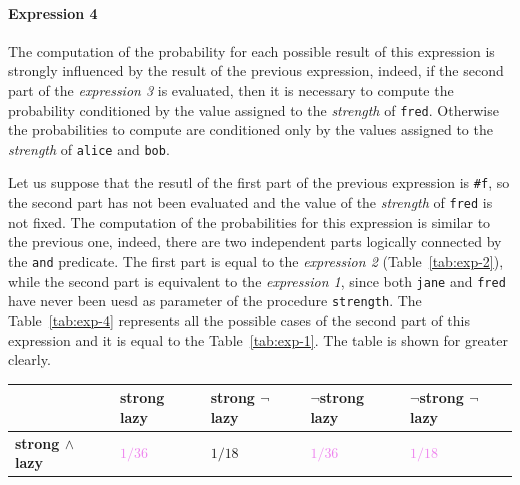 \begin{itemize}
        \paragraph*{Expression 4} The computation of the probability for each possible result of this expression is strongly 
        influenced by the result of the previous expression, indeed, if the second part of the \textit{expression 3} is evaluated,
        then it is necessary to compute the probability conditioned by the value assigned to the \textit{strength} of \texttt{\textquotesingle fred}.
        Otherwise the probabilities to compute are conditioned only by the values assigned to the \textit{strength} of \texttt{\textquotesingle alice}
        and \texttt{\textquotesingle bob}.

        Let us suppose that the resutl of the first part of the previous expression is \texttt{\#f}, so the second part has not been
        evaluated and the value of the \textit{strength} of \texttt{\textquotesingle fred} is not fixed.
        The computation of the probabilities for this expression is similar to the previous one, indeed, there are two independent
        parts logically connected by the \texttt{and} predicate. The first part is equal to the \textit{expression 2} 
        (Table~\ref{tab:exp-2}), while the second part is equivalent to the \textit{expression 1}, since both \texttt{\textquotesingle jane} and
        \texttt{\textquotesingle fred} have never been uesd as parameter of the procedure \texttt{strength}.
        The Table~\ref{tab:exp-4} represents all the possible cases of the second part of this expression and it is equal to
        the Table~\ref{tab:exp-1}. The table is shown for greater clearly. 
        \begin{table}[H]
            \centering
            \bgroup
                \def\arraystretch{1.5}
                \begin{tabular}{| l | C{1.8cm} C{1.8cm} C{1.8cm} C{1.8cm}  |}                    
                    \hline
                     & 
                        \textbf{strong lazy} & \textbf{strong $\neg$lazy} & \textbf{$\neg$strong lazy} & \textbf{$\neg$strong $\neg$lazy} \\
                    \hline

                    \textbf{strong $\land$ lazy} & \textcolor{Violet}{$1/36$} & \textcolor{RedOrange}{$1/18$} & 
                        \textcolor{Violet}{$1/36$} & \textcolor{Violet}{$1/18$} \\ 


\end{tabular}
\end{table}
\end{itemize}
